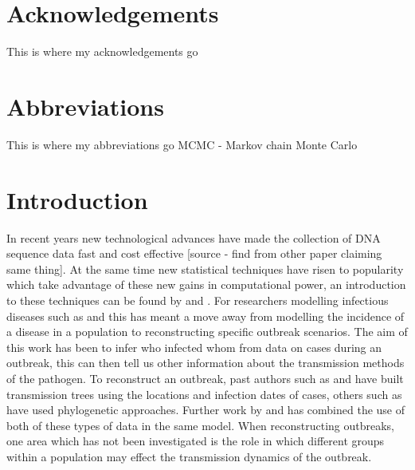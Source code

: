 \documentclass[11pt,a4paper]{report}
\begin{document}
\newpage

\chapter*{Acknowledgements}
\thispagestyle{empty}
This is where my acknowledgements go
\newpage

\tableofcontents
\pagestyle{plain}
\newpage

\chapter*{Abbreviations}
\thispagestyle{empty}
This is where my abbreviations go
MCMC - Markov chain Monte Carlo
\newpage


\chapter{Introduction}
In recent years new technological advances have made the collection of DNA sequence data fast and cost effective [source - find from other paper claiming same thing]. At the same time new statistical techniques have risen to popularity which take advantage of these new gains in computational power, an introduction to these techniques can be found by \citet{ONeill02} and \citet{Gibson04}. For researchers modelling infectious diseases such as \citet{Teunis13} and \citet{Wallinga04} this has meant a move away from modelling the incidence of a disease in a population to reconstructing specific outbreak scenarios. The aim of this work has been to infer who infected whom from data on cases during an outbreak, this can then tell us other information about the transmission methods of the pathogen. To reconstruct an outbreak, past authors such as \citet{Haydon03} and \citet{Jombart11} have built transmission trees using the locations and infection dates of cases, others such as \citet{Cottam08} have used phylogenetic approaches. Further work by \citet{Ypma13} and \citet{outbrkr} has combined the use of both of these types of data in the same model. When reconstructing outbreaks, one area which has not been investigated is the role in which different groups within a population may effect the transmission dynamics of the outbreak.
\end{document}
